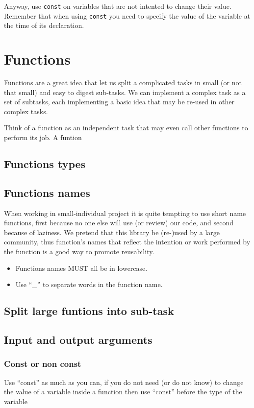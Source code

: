 \documentclass[12pt,a4paper,final]{report} %
\begin{document}
Anyway, use \texttt{const} on variables that are not intented to
change their value. Remember that when using \texttt{const} you need
to specify the value of the variable at the time of its declaration.

\section{Functions}
Functions are a great idea that let us split a complicated tasks in
small (or not that small) and easy to digest sub-tasks. We can
implement a complex task as a set of subtasks, each implementing a
basic idea that may be re-used in other complex tasks.

Think of a function as an independent task that may even call other
functions to perform its job. A funtion

\subsection{Functions types}

\subsection{Functions names}
When working in small-individual project it is quite tempting to use
short name functions, first because no one else will use (or review)
our code, and second because of laziness. We pretend that this library
be (re-)used by a large community, thus function's names that reflect
the intention or work performed by the function is a good way to
promote reusability.

\begin{itemize}
  \item Functions names MUST all be in lowercase.
  \item Use ``\_'' to separate words in the function name.
\end{itemize}

\subsection{Split large funtions into sub-task}

\subsection{Input and output arguments}

\subsubsection{Const or non const}
Use ``const'' as much as you can, if you do not need (or do not know)
to change the value of a variable inside a function then use ``const''
before the type of the variable\\
\end{document}
